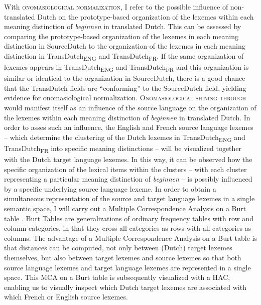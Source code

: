 With \textsc{onomasiological normalization}, I refer to the possible influence of non-translated Dutch on the prototype-based organization of the lexemes within each meaning distinction of \textit{beginnen} in translated Dutch. This can be assessed by comparing the prototype-based organization of the lexemes in each meaning distinction in SourceDutch to the organization of the lexemes in each meaning distinction in TransDutch\textsubscript{ENG} and TransDutch\textsubscript{FR}. If the same organization of lexemes appears in TransDutch\textsubscript{ENG} and TransDutch\textsubscript{FR} and this organization is similar or identical to the organization in SourceDutch, there is a good chance that the TransDutch fields are ``conforming'' to the SourceDutch field, yielding evidence for onomasiological normalization. \textsc{Onomasiological shining through} would manifest itself as an influence of the source language on the organization of the lexemes within each meaning distinction of \textit{beginnen} in translated Dutch. In order to asses such an influence, the English and French source language lexemes – which determine the clustering of the Dutch lexemes in TransDutch\textsubscript{ENG} and TransDutch\textsubscript{FR} into specific meaning distinctions – will be visualized together with the Dutch target language lexemes. In this way, it can be observed how the specific organization of the lexical items within the clusters – with each cluster representing a particular meaning distinction of \textit{beginnen} – is possibly influenced by a specific underlying source language lexeme. In order to obtain a simultaneous representation of the source and target language lexemes in a single semantic space, I will carry out a Multiple Correspondence Analysis on a Burt table \citep{greenacre_simple_2006, greenacre_correspondence_2007}. Burt Tables are generalizations of ordinary frequency tables with row and column categories, in that they cross all categories as rows with all categories as columns. The advantage of a Multiple Correspondence Analysis on a Burt table is that distances can be computed, not only between (Dutch) target lexemes themselves, but also between target lexemes and source lexemes so that both source language lexemes and target language lexemes are represented in a single space. This MCA on a Burt table is subsequently visualized with a HAC, enabling us to visually inspect which Dutch target lexemes are associated with which French or English source lexemes.

